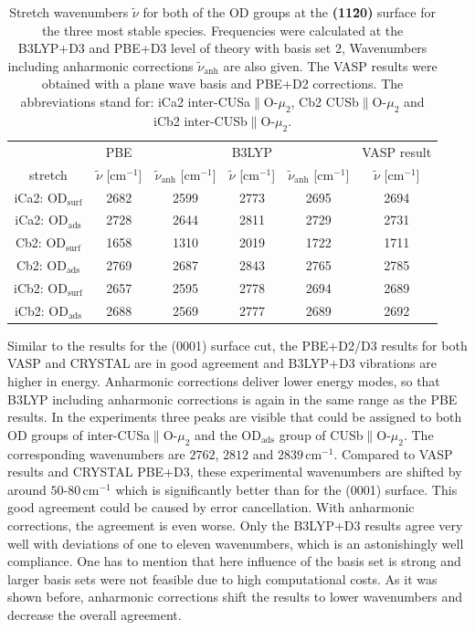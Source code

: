 \documentclass[11pt,DIV=13,BCOR=5mm,a4paper,headinclude]{scrbook}
\begin{document}
\begin{table}[!h]
  \centering
  \caption{Stretch wavenumbers $\tilde{\nu}$ for both of the OD groups at the \textbf{(11\=20)} surface for the three most stable species.
Frequencies were calculated at the B3LYP+D3 and PBE+D3 level of theory with basis set 2, Wavenumbers including anharmonic corrections $\tilde{\nu}_\textrm{anh}$ are also given.
The VASP results were obtained with a plane wave basis and PBE+D2 corrections.
The abbreviations stand for: iCa2 inter-CUSa$\parallel$O-$\mu_2$, Cb2 CUSb$\parallel$O-$\mu_2$ and iCb2 inter-CUSb$\parallel$O-$\mu_2$.}
  \begin{tabular}{ccc|cc|c}
  \toprule
   & PBE& & B3LYP & &VASP result\\
  stretch & $\tilde{\nu}$ [cm$^{-1}$] &$\tilde{\nu}_\textrm{anh}$ [cm$^{-1}$] &$\tilde{\nu}$ [cm$^{-1}$] & $\tilde{\nu}_\textrm{anh}$ [cm$^{-1}$]&$\tilde{\nu}$ [cm$^{-1}$]\\\midrule
  iCa2: OD$_{\textrm{surf}}$ &2682 &2599 &2773 &2695 & 2694\\
  iCa2: OD$_{\textrm{ads}}$  &2728 &2644 &2811 &2729 & 2731\\
  Cb2: OD$_{\textrm{surf}}$  &1658 &1310 &2019 &1722 & 1711\\
  Cb2: OD$_{\textrm{ads}}$   &2769 &2687 &2843 &2765 & 2785\\
  iCb2: OD$_{\textrm{surf}}$ &2657 &2595 &2778 &2694 & 2689\\
  iCb2: OD$_{\textrm{ads}}$  &2688 &2569 &2777 &2689 & 2692\\\bottomrule
  \end{tabular}
  \label{tab:freqs_11-20_crystal}
\end{table}
Similar to the results for the (0001) surface cut, the PBE+D2/D3 results for both VASP and CRYSTAL are in good agreement and B3LYP+D3 vibrations are higher in energy.
Anharmonic corrections deliver lower energy modes, so that B3LYP including anharmonic corrections is again in the same range as the PBE results.
In the experiments \cite{Heiden11-20_2018} three peaks are visible that could be assigned to both OD groups of inter-CUSa$\parallel$O-$\mu_2$ and the OD$_\textrm{ads}$ group of CUSb$\parallel$O-$\mu_2$.
The corresponding wavenumbers are $2762$, $2812$ and $2839\,$cm$^{-1}$.
Compared to VASP results and CRYSTAL PBE+D3, these experimental wavenumbers are shifted by around $50$-$80\,$cm$^{-1}$ which is significantly better than for the (0001) surface.
This good agreement could be caused by error cancellation.
With anharmonic corrections, the agreement is even worse.
Only the B3LYP+D3 results agree very well with deviations of one to eleven wavenumbers, which is an astonishingly well compliance.
One has to mention that here influence of the basis set is strong and larger basis sets were not feasible due to high computational costs.
As it was shown before, anharmonic corrections shift the results to lower wavenumbers and decrease the overall agreement.
\end{document}
